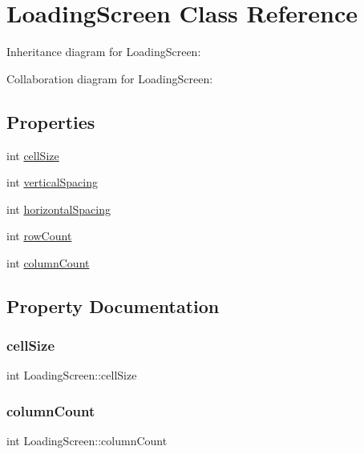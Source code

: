 \hypertarget{class_loading_screen}{}\section{Loading\+Screen Class Reference}
\label{class_loading_screen}


Inheritance diagram for Loading\+Screen\+:


Collaboration diagram for Loading\+Screen\+:
\subsection*{Properties}
\begin{DoxyCompactItemize}
\item 
int \hyperlink{class_loading_screen_a58f6f5c34f4f6a8cde923acc1236f95f}{cell\+Size}
\item 
int \hyperlink{class_loading_screen_adf429228d3c540ccab99be13065b11af}{vertical\+Spacing}
\item 
int \hyperlink{class_loading_screen_a7764e6e7ad13a3e845dd725ce09f668f}{horizontal\+Spacing}
\item 
int \hyperlink{class_loading_screen_a7f56e8b4ae8c0473e29c138e553fc107}{row\+Count}
\item 
int \hyperlink{class_loading_screen_af670b970607a9e4bea04e93b02e9062c}{column\+Count}
\end{DoxyCompactItemize}


\subsection{Property Documentation}
\mbox{\label{class_loading_screen_a58f6f5c34f4f6a8cde923acc1236f95f}} 
\subsubsection{\texorpdfstring{cell\+Size}{cellSize}}
{\footnotesize\ttfamily int Loading\+Screen\+::cell\+Size}

\mbox{\label{class_loading_screen_af670b970607a9e4bea04e93b02e9062c}} 
\subsubsection{\texorpdfstring{column\+Count}{columnCount}}
{\footnotesize\ttfamily int Loading\+Screen\+::column\+Count}

